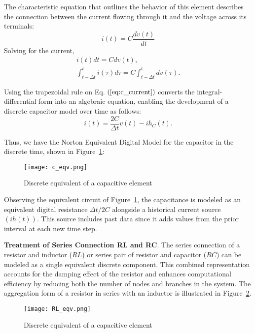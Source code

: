 The characteristic equation that outlines the behavior of this element describes the connection between the current flowing through it and the voltage across its terminals:
\begin{equation}
    i(t)=C \frac{d v(t)}{d t}
\end{equation}
Solving for the current,
\begin{equation}
\begin{array}{c}
    \displaystyle i(t) d t=C d v(t),\\[1em]
    \displaystyle \int_{t-\Delta t}^{t} i(\tau) d \tau=C \int_{t-\Delta t}^{t} d v(\tau).
    \label{eq:c_current}
    \end{array}
\end{equation}

Using the trapezoidal rule on Eq. $(\ref{eq:c_current})$ converts the integral-differential form into an algebraic equation, enabling the development of a discrete capacitor model over time as follows:
\begin{equation}
    i(t)=\frac{2 C}{\Delta t} v(t)-i h_{C}(t).
\end{equation}

Thus, we have the Norton Equivalent Digital Model for the capacitor in the discrete time, shown in Figure~\cref{fig:c_eqv}:

\begin{figure}[htbp]
    \centering
    \texttt{[image: c\_eqv.png]}
    \caption{Discrete equivalent of a capacitive element}
    \label{fig:c_eqv}
\end{figure}

Observing the equivalent circuit of Figure~\cref{fig:c_eqv}, the capacitance is modeled as an equivalent digital resistance $\Delta t/2C$ alongside a historical current source $(ih(t))$. This source includes past data since it adds values from the prior interval at each new time step.

\textbf{Treatment of Series Connection RL and RC}. The series connection of a resistor and inductor ($RL$) or series pair of resistor and capacitor ($RC$) can be modeled as a single equivalent discrete component. This combined representation accounts for the damping effect of the resistor and enhances computational efficiency by reducing both the number of nodes and branches in the system. The aggregation form of a resistor in series with an inductor is illustrated in Figure~\cref{fig:RL_eqv}.

\begin{figure}[htbp]
    \centering
    \texttt{[image: RL\_eqv.png]}
    \caption{Discrete equivalent of a capacitive element}
    \label{fig:RL_eqv}
\end{figure}

